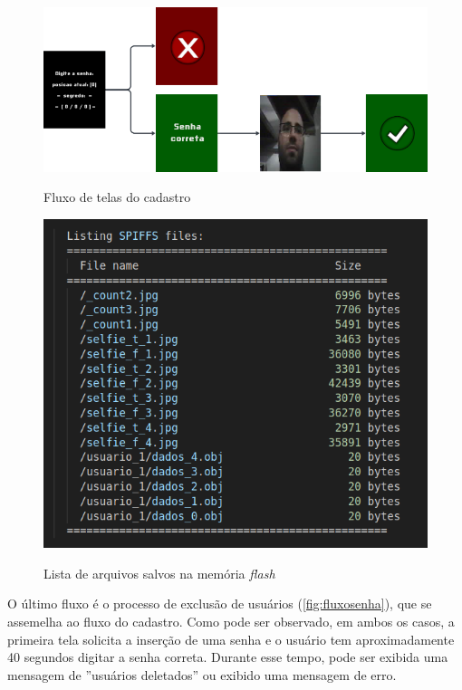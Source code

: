 \begin{figure}[h!]
    \centering
    \caption{Fluxo de telas do cadastro}
    \includegraphics[scale=2]{figuras/fluxo_cadastro.png}
    \fonte{}%
    \label{fig:fluxocadastro}
    \centering
\end{figure}

\begin{figure}[h!]
    \centering
    \caption{Lista de arquivos salvos na memória \textit{flash}}
    \includegraphics[scale=0.4]{figuras/dados_memoria.png}
    \fonte{}%
    \label{fig:dadosmemoria}
    \centering
\end{figure}

O último fluxo é o processo de exclusão 
de usuários (\autoref{fig:fluxosenha}), que se assemelha 
ao fluxo do cadastro. Como pode ser observado, em ambos 
os casos, a primeira tela solicita a inserção 
de uma senha e o usuário tem aproximadamente 40 segundos 
digitar a senha correta. Durante esse tempo, 
pode ser exibida uma mensagem de ''usuários deletados'' ou 
exibido uma mensagem de erro. 

